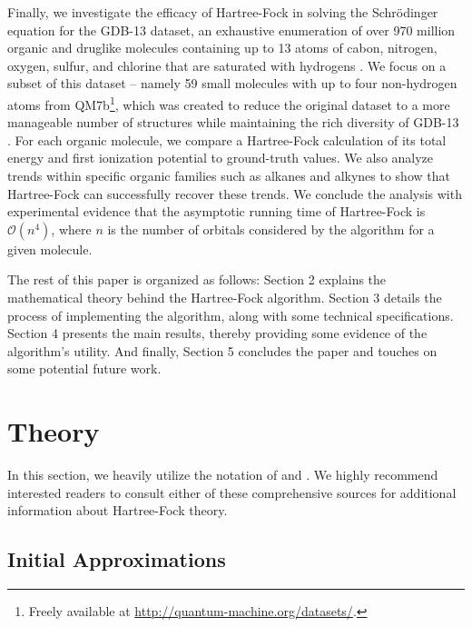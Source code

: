 \documentclass[12pt]{article}
\newcommand{\Oh}{\mathcal{O}}
\begin{document}
Finally, we investigate the efficacy of Hartree-Fock in solving the Schr\"odinger equation for the GDB-13 dataset, an exhaustive enumeration of over 970 million organic and druglike molecules containing up to 13 atoms of cabon, nitrogen, oxygen, sulfur, and chlorine that are saturated with hydrogens \cite{blum2009}.  We focus on a subset of this dataset -- namely 59 small molecules with up to four non-hydrogen atoms from QM7b\footnote{Freely available at \url{http://quantum-machine.org/datasets/}.}, which was created to reduce the original dataset to a more manageable number of structures while maintaining the rich diversity of GDB-13 \cite{montavon2013}.  For each organic molecule, we compare a Hartree-Fock calculation of its total energy and first ionization potential to ground-truth values.  We also analyze trends within specific organic families such as alkanes and alkynes to show that Hartree-Fock can successfully recover these trends.  We conclude the analysis with experimental evidence that the asymptotic running time of Hartree-Fock is $\Oh(n^4)$, where $n$ is the number of orbitals considered by the algorithm for a given molecule.

The rest of this paper is organized as follows: Section 2 explains the mathematical theory behind the Hartree-Fock algorithm.  Section 3 details the process of implementing the algorithm, along with some technical specifications.  Section 4 presents the main results, thereby providing some evidence of the algorithm's utility.  And finally, Section 5 concludes the paper and touches on some potential future work.  

\section{Theory}

In this section, we heavily utilize the notation of \cite{sherrill2001} and \cite{szabo2012}.  We highly recommend interested readers to consult either of these comprehensive sources for additional information about Hartree-Fock theory.

\subsection{Initial Approximations}
\end{document}
